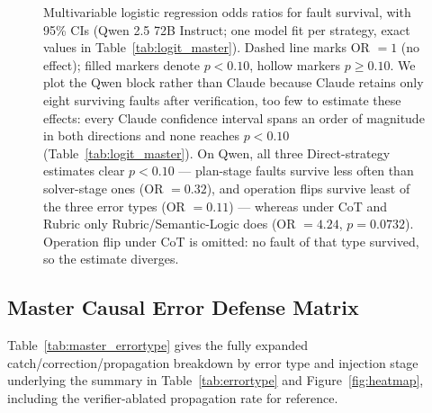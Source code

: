 \documentclass[11pt]{article}
\begin{document}
\begin{figure}[H]
\caption{Multivariable logistic regression odds ratios for fault survival, with 95\% CIs
(Qwen 2.5 72B Instruct; one model fit per strategy, exact values in
Table~\ref{tab:logit_master}). Dashed line marks OR $=1$ (no effect); filled markers denote
$p<0.10$, hollow markers $p\geq0.10$. We plot the Qwen block rather than Claude because
Claude retains only eight surviving faults after verification, too few to estimate these
effects: every Claude confidence interval spans an order of magnitude in both directions
and none reaches $p<0.10$ (Table~\ref{tab:logit_master}). On Qwen, all three
Direct-strategy estimates clear $p<0.10$ --- plan-stage faults survive less often than
solver-stage ones (OR $=0.32$), and operation flips survive least of the three error types
(OR $=0.11$) --- whereas under CoT and Rubric only Rubric/Semantic-Logic does
(OR $=4.24$, $p=0.0732$). Operation flip under CoT is omitted: no fault of that type
survived, so the estimate diverges.}\label{fig:forest}
\end{figure}

\subsection{Master Causal Error Defense Matrix}
Table~\ref{tab:master_errortype} gives the fully expanded catch/correction/propagation
breakdown by error type and injection stage underlying the summary in Table~\ref{tab:errortype}
and Figure~\ref{fig:heatmap}, including the verifier-ablated propagation rate for reference.
\end{document}
